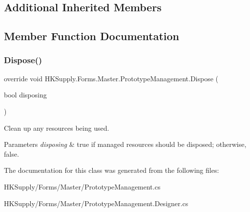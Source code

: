 \subsection*{Additional Inherited Members}


\subsection{Member Function Documentation}
\mbox{\label{class_h_k_supply_1_1_forms_1_1_master_1_1_prototype_management_a4c4a0740e023fa6eed0d1648fb5f7c33}} 
\subsubsection{\texorpdfstring{Dispose()}{Dispose()}}
{\footnotesize\ttfamily override void H\+K\+Supply.\+Forms.\+Master.\+Prototype\+Management.\+Dispose (\begin{DoxyParamCaption}\item[{bool}]{disposing }\end{DoxyParamCaption})\hspace{0.3cm}{\ttfamily [protected]}}



Clean up any resources being used. 


\begin{DoxyParams}{Parameters}
{\em disposing} & true if managed resources should be disposed; otherwise, false.\\
\hline
\end{DoxyParams}


The documentation for this class was generated from the following files\+:\begin{DoxyCompactItemize}
\item 
H\+K\+Supply/\+Forms/\+Master/Prototype\+Management.\+cs\item 
H\+K\+Supply/\+Forms/\+Master/Prototype\+Management.\+Designer.\+cs\end{DoxyCompactItemize}
